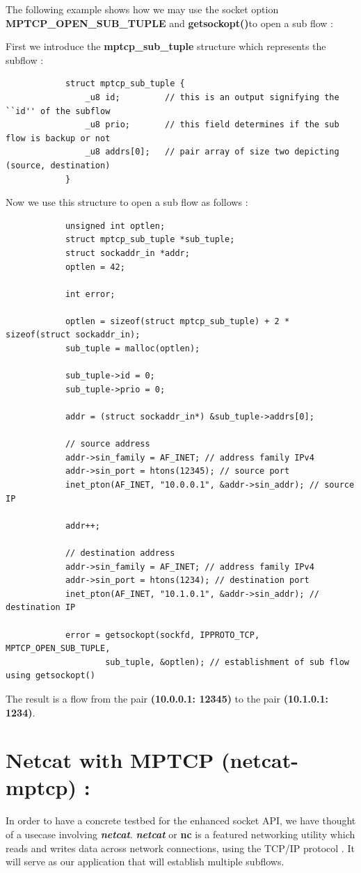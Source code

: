 \documentclass[a4paper,11pt]{article}
\begin{document}
			\raggedright{The following example shows how we may use the socket option \textbf{MPTCP\_OPEN\_SUB\_TUPLE} and \textbf{getsockopt()}to open a sub flow \cite{api}:}

			First we introduce the \textbf{mptcp\_sub\_tuple} structure which represents the subflow :
			\begin{lstlisting}
			struct mptcp_sub_tuple {
				_u8 id;			// this is an output signifying the ``id'' of the subflow
				_u8 prio;		// this field determines if the sub flow is backup or not
				_u8 addrs[0];	// pair array of size two depicting (source, destination)
			}
			\end{lstlisting}
			Now we use this structure to open a sub flow as follows :
			\begin{lstlisting}
   			unsigned int optlen;
   			struct mptcp_sub_tuple *sub_tuple;
   			struct sockaddr_in *addr;
   			optlen = 42;

   			int error;

   			optlen = sizeof(struct mptcp_sub_tuple) + 2 * sizeof(struct sockaddr_in);
   			sub_tuple = malloc(optlen);

   			sub_tuple->id = 0;
   			sub_tuple->prio = 0;

   			addr = (struct sockaddr_in*) &sub_tuple->addrs[0];

   			// source address
   			addr->sin_family = AF_INET; // address family IPv4
   			addr->sin_port = htons(12345); // source port
   			inet_pton(AF_INET, "10.0.0.1", &addr->sin_addr); // source IP

   			addr++;

   			// destination address
   			addr->sin_family = AF_INET; // address family IPv4
   			addr->sin_port = htons(1234); // destination port
   			inet_pton(AF_INET, "10.1.0.1", &addr->sin_addr); // destination IP

   			error = getsockopt(sockfd, IPPROTO_TCP, MPTCP_OPEN_SUB_TUPLE,
                    sub_tuple, &optlen); // establishment of sub flow using getsockopt()
			\end{lstlisting}

		The result is a flow from the pair \textbf{(10.0.0.1: 12345)} to the pair \textbf{(10.1.0.1: 1234)}.

	
	\section{Netcat with MPTCP (netcat-mptcp) :}
		\label{sec:netcat-mptcp}
		In order to have a concrete testbed for the enhanced socket API, we have thought of a usecase involving \textbf{\emph{netcat}}. \textbf{\emph{netcat}} or \textbf{nc} is a featured networking utility which reads and writes data across network connections, using the TCP/IP protocol \cite{nc}. It will serve as our application that will establish multiple subflows.
\end{document}
